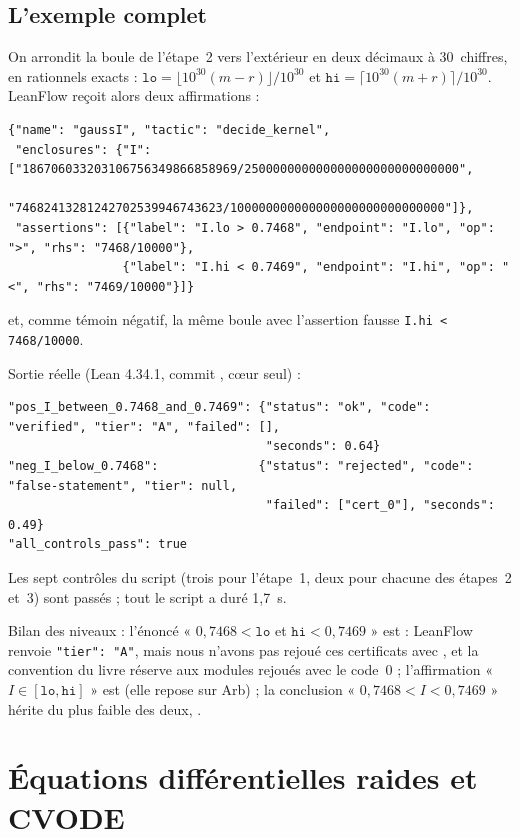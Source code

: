 \subsection{L'exemple complet}
On arrondit la boule de l'étape~2 vers l'extérieur en deux décimaux à 30~chiffres, en rationnels exacts :
$\mathtt{lo}=\lfloor10^{30}(m-r)\rfloor/10^{30}$ et $\mathtt{hi}=\lceil10^{30}(m+r)\rceil/10^{30}$. LeanFlow reçoit
alors deux affirmations :
\begin{lstlisting}[style=appC,language={}]
{"name": "gaussI", "tactic": "decide_kernel",
 "enclosures": {"I": ["186706033203106756349866858969/250000000000000000000000000000",
                      "74682413281242702539946743623/100000000000000000000000000000"]},
 "assertions": [{"label": "I.lo > 0.7468", "endpoint": "I.lo", "op": ">", "rhs": "7468/10000"},
                {"label": "I.hi < 0.7469", "endpoint": "I.hi", "op": "<", "rhs": "7469/10000"}]}
\end{lstlisting}
et, comme témoin négatif, la même boule avec l'assertion fausse \texttt{I.hi < 7468/10000}.
\begin{numbox}
Sortie réelle (Lean 4.34.1, commit , cœur seul) :
\begin{lstlisting}[style=appC,language={}]
"pos_I_between_0.7468_and_0.7469": {"status": "ok", "code": "verified", "tier": "A", "failed": [],
                                    "seconds": 0.64}
"neg_I_below_0.7468":              {"status": "rejected", "code": "false-statement", "tier": null,
                                    "failed": ["cert_0"], "seconds": 0.49}
"all_controls_pass": true
\end{lstlisting}
Les sept contrôles du script (trois pour l'étape~1, deux pour chacune des étapes~2 et~3) sont passés ; tout le script a duré 1,7~s.
\end{numbox}
\noindent Bilan des niveaux : l'énoncé « $0{,}7468<\mathtt{lo}$ et $\mathtt{hi}<0{,}7469$ » est \tierAs{} : LeanFlow
renvoie \texttt{"tier": "A"}, mais nous n'avons pas rejoué ces certificats avec , et la convention
du livre réserve \tierA{} aux modules rejoués avec le code~$0$ ; l'affirmation « $I\in[\mathtt{lo},\mathtt{hi}]$ » est \tierC{} (elle repose sur Arb) ; la
conclusion « $0{,}7468<I<0{,}7469$ » hérite du plus faible des deux, \tierC.

\section{Équations différentielles raides et CVODE}\label{appD:sec:cvode}


